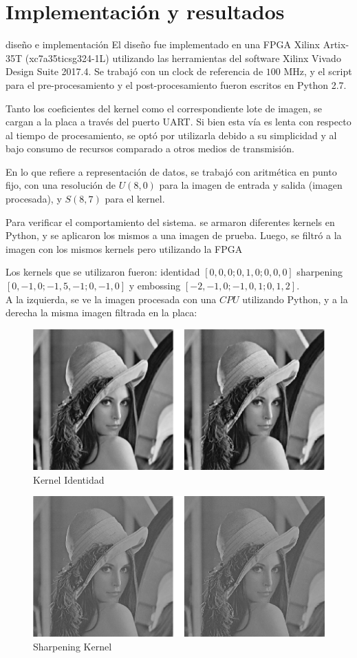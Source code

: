 \documentclass[a4paper]{article}
\begin{document}
\section{Implementación y resultados}
 diseño e implementación
El diseño fue implementado en una FPGA Xilinx Artix-35T (xc7a35ticsg324-1L) utilizando las herramientas del software
Xilinx Vivado Design Suite 2017.4. Se trabajó con un clock de referencia de $100$ MHz, y el script para el pre-procesamiento 
y el post-procesamiento fueron escritos en Python 2.7.

Tanto los coeficientes del kernel como el correspondiente lote de imagen, se cargan a la placa a través
del puerto UART. Si bien esta vía es lenta con respecto al tiempo de procesamiento, se optó por utilizarla
debido a su simplicidad y al bajo consumo de recursos comparado a otros medios de transmisión.

En lo que refiere a representación de datos, se trabajó con aritmética en punto fijo, con una
resolución de $U(8,0)$ para la imagen de entrada y salida (imagen procesada), y $S(8,7)$ para el kernel.


Para verificar el comportamiento del sistema. se armaron diferentes kernels
en Python, y se aplicaron los mismos a una imagen de prueba. Luego, 
se filtró a la imagen con los mismos kernels  pero utilizando la FPGA

Los kernels que se utilizaron fueron: identidad $[0, 0, 0; 0, 1, 0; 0, 0,
0]$ sharpening $[0, -1, 0; -1, 5, -1; 0, -1, 0]$ y embossing $[-2, -1, 0; -1,
0, 1; 0, 1, 2]$.\\


A la izquierda, se ve la imagen procesada con una $CPU$ utilizando Python, y a la derecha
la misma imagen filtrada en la placa:


\begin{figure}[H]
\centering
\includegraphics[scale=0.9]{identity_c}
\caption{Kernel Identidad}
\label{identity}
\end{figure}
\begin{figure}[H]
\centering
\includegraphics[scale=0.9]{shaped_c}
\caption{Sharpening Kernel}
\label{sharp}
\end{figure}
\end{document}
